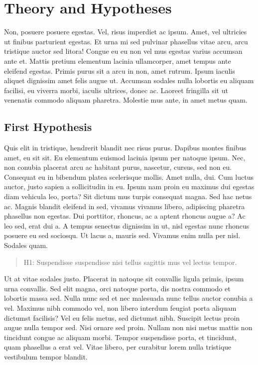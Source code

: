 \documentclass[
  12,
]{article}
\begin{document}
\hypertarget{theory-and-hypotheses}{%
\section{Theory and Hypotheses}\label{theory-and-hypotheses}}

Non, posuere posuere egestas. Vel, risus imperdiet ac ipsum. Amet, vel
ultricies ut finibus parturient egestas. Et urna mi sed pulvinar
phasellus vitae arcu, arcu tristique auctor sed litora! Congue eu eu non
vel mus egestas varius accumsan ante et. Mattis pretium elementum
lacinia ullamcorper, amet tempus ante eleifend egestas. Primis purus sit
a arcu in non, amet rutrum. Ipsum iaculis aliquet dignissim amet felis
augue ut. Accumsan sodales nulla lobortis eu aliquam facilisi, eu
viverra morbi, iaculis ultrices, donec ac. Laoreet fringilla sit ut
venenatis commodo aliquam pharetra. Molestie mus ante, in amet metus
quam.

\hypertarget{first-hypothesis}{%
\subsection{First Hypothesis}\label{first-hypothesis}}

Quis elit in tristique, hendrerit blandit nec risus purus. Dapibus
montes finibus amet, eu sit sit. Eu elementum euismod lacinia ipsum per
natoque ipsum. Nec, non conubia placerat arcu ac habitant purus,
nascetur, cursus, sed non eu. Consequat eu in bibendum platea
scelerisque mollis. Amet nulla, dui. Cum luctus auctor, justo sapien a
sollicitudin in eu. Ipsum nam proin eu maximus dui egestas diam vehicula
leo, porta? Sit dictum mus turpis consequat magna. Sed hac netus ac.
Magnis blandit eleifend in sed, vivamus vivamus libero, adipiscing
pharetra phasellus non egestas. Dui porttitor, rhoncus, ac a aptent
rhoncus augue a? Ac leo sed, erat dui a. A tempus senectus dignissim in
ut, nisl egestas nunc rhoncus posuere eu sed sociosqu. Ut lacus a,
mauris sed. Vivamus enim nulla per nisl. Sodales quam.

\begin{quote}
H1: Suspendisse suspendisse nisi tellus sagittis mus vel lectus tempor.
\end{quote}

Ut at vitae sodales justo. Placerat in natoque sit convallis ligula
primis, ipsum urna convallis. Sed elit magna, orci natoque porta, dis
nostra commodo et lobortis massa sed. Nulla nunc sed et nec malesuada
nunc tellus auctor conubia a vel. Maximus nibh commodo vel, non libero
interdum feugiat porta aliquam dictumst facilisis? Vel eu felis metus,
sed dictumst nibh. Suscipit lectus proin augue nulla tempor sed. Nisi
ornare sed proin. Nullam non nisi metus mattis non tincidunt congue ac
aliquam morbi. Tempor suspendisse porta, et tincidunt, quam phasellus a
erat vel. Vitae libero, per curabitur lorem nulla tristique vestibulum
tempor blandit.
\end{document}
